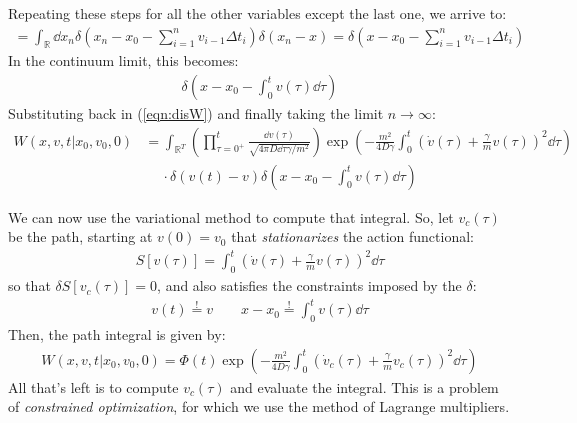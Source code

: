 \documentclass[../template.tex]{subfiles}
\begin{document}
Repeating these steps for all the other variables except the last one, we arrive to:
\begin{align*}
    = \int_{\mathbb{R}} \dd{x_n} \delta\left(x_n - x_0 - \sum_{i=1}^n v_{i-1} \Delta t_i\right) \delta(x_n - x) = \delta\left(x- x_0 - \sum_{i=1}^n v_{i-1} \Delta t_i\right)
\end{align*}
In the continuum limit, this becomes:
\begin{align*}
    \delta\left(x-x_0 - \int_0^t v(\tau) \dd{\tau}\right)
\end{align*}
Substituting back in (\ref{eqn:disW}) and finally taking the limit $n \to \infty$:
\begin{align*}
    W(x,v,t|x_0,v_0,0) &= \int_{\mathbb{R}^T} \left(\prod_{\tau=0^+}^t \frac{\dd{v(\tau)}}{\sqrt{4 \pi D \dd{\tau} \gamma /m^2}}\right) \exp\left(-\frac{m^2}{4 D \gamma} \int_0^t \left(\dot{v}(\tau) + \frac{\gamma}{m} v(\tau) \right)^2\dd{\tau} \right)\\
    &\quad \>\cdot  \delta(v(t) -v ) \delta\left(x- x_0 - \int_0^t v(\tau) \dd{\tau}\right)
\end{align*}

We can now use the variational method to compute that integral. So, let $v_c(\tau)$ be the path, starting at $v(0) = v_0$ that \textit{stationarizes} the action functional:
\begin{align*}
    S[v(\tau)] = \int_0^t \left(\dot{v}(\tau) +  \frac{\gamma}{m} v(\tau) \right)^2 \dd{\tau}
\end{align*}
so that $\delta S[v_c(\tau)] = 0$, and also satisfies the constraints imposed by the $\delta$:
\begin{align*}
    v(t) \overset{!}{=}  v \qquad x-x_0 \overset{!}{=}  \int_0^t v(\tau) \dd{\tau}
\end{align*}
Then, the path integral is given by:
\begin{align}
    W(x,v,t|x_0,v_0,0) = \Phi(t) \exp\left(-\frac{m^2}{4 D \gamma} \int_0^t \left(\dot{v}_c(\tau) + \frac{\gamma}{m}v_c(\tau) \right)^2 \dd{\tau} \right)
    \label{eqn:underdamped-variational}
\end{align}
All that's left is to compute $v_c(\tau)$ and evaluate the integral. This is a problem of \textit{constrained optimization}, for which we use the method of Lagrange multipliers. 
\end{document}
